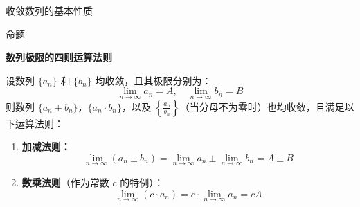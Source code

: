 \documentclass[aspectratio=169,10pt,fontset=fandol]{ctexbeamer}
\begin{document}
\begin{frame}[t,fragile]{收敛数列的基本性质}
\small
\begin{block}{命题}
{\small
\textbf{数列极限的四则运算法则}\par



设数列 $\{a_n\}$ 和 $\{b_n\}$ 均收敛，且其极限分别为：
\begin{equation*}
	\lim\limits_{n \to \infty} a_n = A, \quad \lim\limits_{n \to \infty} b_n = B
\end{equation*}
则数列 $\{a_n \pm b_n\}$，$\{a_n \cdot b_n\}$，以及 $\left\{\frac{a_n}{b_n}\right\}$（当分母不为零时）也均收敛，且满足以下运算法则：

\begin{enumerate}
	\item \textbf{加减法则：}
	\begin{equation*}
		\lim\limits_{n \to \infty} (a_n \pm b_n) = \lim\limits_{n \to \infty} a_n \pm \lim\limits_{n \to \infty} b_n = A \pm B
	\end{equation*}
	
	\item \textbf{数乘法则}（作为常数 $c$ 的特例）：
	\begin{equation*}
		\lim\limits_{n \to \infty} (c \cdot a_n) = c \cdot \lim\limits_{n \to \infty} a_n = cA
	\end{equation*}
	
	
\end{enumerate}
}
\end{block}
\end{frame}
\end{document}
